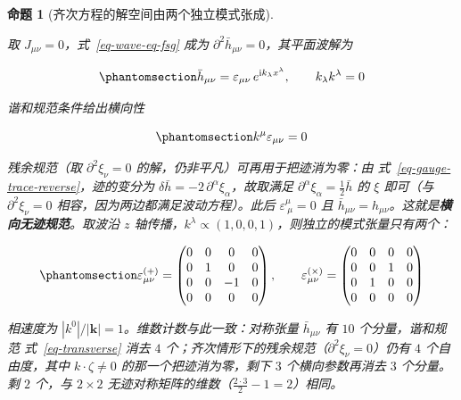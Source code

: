 \documentclass[
  chinese,
  a4paper,
  UTF8,
  12pt,
  oneside,
  openany]{ctexbook}
\theoremstyle{plain}
\theoremstyle{plain}
\theoremstyle{plain}
\newtheorem{proposition}{命题}[chapter]
\theoremstyle{definition}
\theoremstyle{plain}
\theoremstyle{plain}
\theoremstyle{remark}
\begin{document}
\begin{proposition}[齐次方程的解空间由两个独立模式张成]\protect\hypertarget{prp-fsg-waves}{}\label{prp-fsg-waves}

取 \(J_{\mu\nu}=0\)，式~\ref{eq-wave-eq-fsg} 成为
\(\partial^{2}\bar h_{\mu\nu}=0\)，其平面波解为

\begin{equation}\protect\phantomsection\label{eq-plane-wave-fsg}{
\bar h_{\mu\nu} = \varepsilon_{\mu\nu}\,e^{\mathrm{i}k_{\lambda}x^{\lambda}},
\qquad
k_{\lambda}k^{\lambda}=0
}\end{equation}

谐和规范条件给出横向性

\begin{equation}\protect\phantomsection\label{eq-transverse}{
k^{\mu}\varepsilon_{\mu\nu}=0
}\end{equation}

残余规范（取 \(\partial^{2}\xi_{\nu}=0\)
的解，仍非平凡）可再用于把迹消为零：由
式~\ref{eq-gauge-trace-reverse}，迹的变分为
\(\delta\bar h=-2\,\partial^{\alpha}\xi_{\alpha}\)，故取满足
\(\partial^{\alpha}\xi_{\alpha}=\frac{1}{2}\bar h\) 的 \(\xi\) 即可（与
\(\partial^{2}\xi_{\nu}=0\) 相容，因为两边都满足波动方程）。此后
\(\varepsilon^{\mu}_{\ \mu}=0\) 且
\(\bar h_{\mu\nu}=h_{\mu\nu}\)。这就是\textbf{横向无迹规范}。取波沿
\(z\)
轴传播，\(k^{\lambda}\propto(1,0,0,1)\)，则独立的模式张量只有两个：

\begin{equation}\protect\phantomsection\label{eq-polarizations}{
\varepsilon^{(+)}_{\mu\nu}=
\begin{pmatrix}
0&0&0&0\\
0&1&0&0\\
0&0&-1&0\\
0&0&0&0
\end{pmatrix},
\qquad
\varepsilon^{(\times)}_{\mu\nu}=
\begin{pmatrix}
0&0&0&0\\
0&0&1&0\\
0&1&0&0\\
0&0&0&0
\end{pmatrix}
}\end{equation}

相速度为 \(|k^{0}|/|\mathbf{k}|=1\)。维数计数与此一致：对称张量
\(\bar h_{\mu\nu}\) 有 \(10\) 个分量，谐和规范 式~\ref{eq-transverse}
消去 \(4\) 个；齐次情形下的残余规范（\(\partial^{2}\xi_{\nu}=0\)）仍有
\(4\) 个自由度，其中 \(k\cdot\zeta\neq0\) 的那一个把迹消为零，剩下 \(3\)
个横向参数再消去 \(3\) 个分量。剩 \(2\) 个，与 \(2\times2\)
无迹对称矩阵的维数（\(\frac{2\cdot3}{2}-1=2\)）相同。

\end{proposition}
\end{document}
